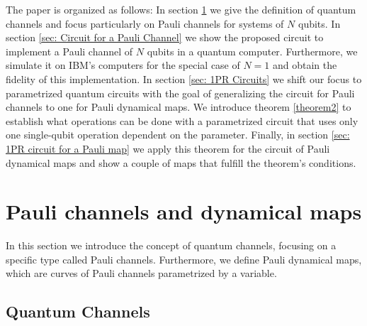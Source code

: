 \documentclass[10pt,letterpaper]{article} %
\begin{document}
The paper is organized as follows: In section \ref{sec: Pauli Channels} 
we give the definition of quantum channels and focus particularly on Pauli channels for systems of
$N$ qubits. 
In section \ref{sec: Circuit for a Pauli Channel} we show the proposed circuit 
to implement a Pauli channel of $N$ qubits in a quantum computer. 
Furthermore, we simulate it on IBM’s computers for the special case of $N=1$
and obtain the fidelity of this implementation.  
In section \ref{sec: 1PR Circuits} we shift our focus to parametrized quantum circuits with the goal of
generalizing the circuit for Pauli channels to one for Pauli dynamical maps. 
We introduce theorem \ref{theorem2} to establish what operations can be done with a 
parametrized circuit that uses only one single-qubit operation dependent on the parameter.
Finally, in section \ref{sec: 1PR circuit for a Pauli map} 
we apply this theorem for the circuit of Pauli dynamical
maps and show a couple of maps that fulfill the theorem's conditions.








\section{Pauli channels and dynamical maps}  \label{sec: Pauli Channels} %


In this section  we introduce the concept of quantum channels, focusing on a
specific type called Pauli channels.  Furthermore, we define Pauli dynamical
maps, which are curves of Pauli channels parametrized by a variable.
\subsection{Quantum Channels} \label{subsec: Quantum Channels} %
\end{document}
